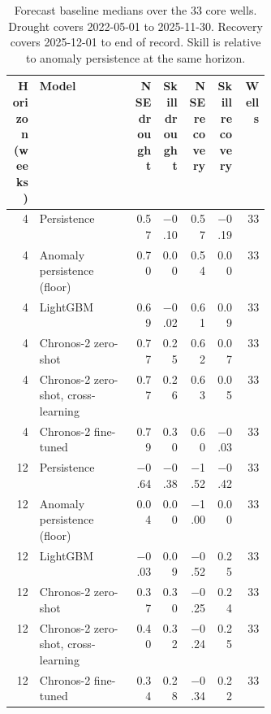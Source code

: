 \begin{table}[p]
\centering
\scriptsize
\setlength{\tabcolsep}{3pt}
\caption{Forecast baseline medians over the 33 core wells. Drought covers 2022-05-01 to 2025-11-30. Recovery covers 2025-12-01 to end of record. Skill is relative to anomaly persistence at the same horizon.}
\label{tab:baselines-forecast}
\begin{tabular}{@{}rp{0.37\linewidth}rrrrr@{}}
\toprule
\shortstack{Horizon\\(weeks)} & Model & \shortstack{NSE\\drought} & \shortstack{Skill\\drought} & \shortstack{NSE\\recovery} & \shortstack{Skill\\recovery} & Wells \\
\midrule
\num{4} & Persistence & \num{0.57} & \num{-0.10} & \num{0.57} & \num{-0.19} & \num{33} \\
\num{4} & Anomaly persistence (floor) & \num{0.70} & \num{0.00} & \num{0.54} & \num{0.00} & \num{33} \\
\num{4} & LightGBM & \num{0.69} & \num{-0.02} & \num{0.61} & \num{0.09} & \num{33} \\
\num{4} & Chronos-2 zero-shot & \num{0.77} & \num{0.25} & \num{0.62} & \num{0.07} & \num{33} \\
\num{4} & Chronos-2 zero-shot, cross-learning & \num{0.77} & \num{0.26} & \num{0.63} & \num{0.05} & \num{33} \\
\num{4} & Chronos-2 fine-tuned & \num{0.79} & \num{0.30} & \num{0.60} & \num{-0.03} & \num{33} \\
\num{12} & Persistence & \num{-0.64} & \num{-0.38} & \num{-1.52} & \num{-0.42} & \num{33} \\
\num{12} & Anomaly persistence (floor) & \num{0.04} & \num{0.00} & \num{-1.00} & \num{0.00} & \num{33} \\
\num{12} & LightGBM & \num{-0.03} & \num{0.09} & \num{-0.52} & \num{0.25} & \num{33} \\
\num{12} & Chronos-2 zero-shot & \num{0.37} & \num{0.30} & \num{-0.25} & \num{0.24} & \num{33} \\
\num{12} & Chronos-2 zero-shot, cross-learning & \num{0.40} & \num{0.32} & \num{-0.24} & \num{0.25} & \num{33} \\
\num{12} & Chronos-2 fine-tuned & \num{0.34} & \num{0.28} & \num{-0.34} & \num{0.22} & \num{33} \\
\bottomrule
\end{tabular}
\end{table}
